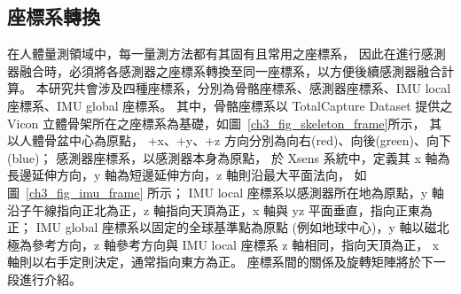 \subsection{座標系轉換}
在人體量測領域中，每一量測方法都有其固有且常用之座標系，
因此在進行感測器融合時，必須將各感測器之座標系轉換至同一座標系，以方便後續感測器融合計算。
本研究共會涉及四種座標系，分別為骨骼座標系、感測器座標系、IMU local 座標系、IMU global 座標系。
其中，骨骼座標系以 TotalCapture Dataset 提供之 Vicon 立體骨架所在之座標系為基礎，如圖~\ref{ch3_fig_skeleton_frame}所示，
其以人體骨盆中心為原點， +x、+y、+z 方向分別為向右(red)、向後(green)、向下(blue)；
感測器座標系，以感測器本身為原點，
於 Xsens 系統中，定義其 x 軸為長邊延伸方向，y 軸為短邊延伸方向，z 軸則沿最大平面法向，
如圖~\ref{ch3_fig_imu_frame} 所示；
IMU local 座標系以感測器所在地為原點，y 軸沿子午線指向正北為正，z 軸指向天頂為正，x 軸與 yz 平面垂直，指向正東為正；
IMU global 座標系以固定的全球基準點為原點 (例如地球中心)，y 軸以磁北極為參考方向，z 軸參考方向與 IMU local 座標系 z 軸相同，指向天頂為正，
x 軸則以右手定則決定，通常指向東方為正。
座標系間的關係及旋轉矩陣將於下一段進行介紹。

